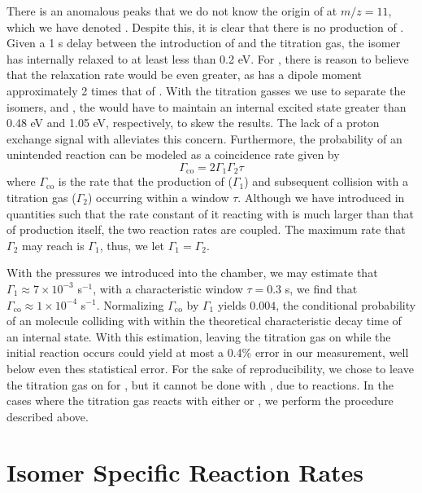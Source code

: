There is an anomalous peaks that we do not know the origin of at $m/z=11$, which we have denoted . Despite this, it is clear that there is no production of . Given a 1 s delay between the introduction of  and the titration gas, the  isomer has internally relaxed to at least less than 0.2 eV. For , there is reason to believe that the relaxation rate would be even greater, as  has a dipole moment approximately 2 times that of .\cite{Rogers1982} With the titration gasses we use to separate the isomers,  and , the  would have to maintain an internal excited state greater than 0.48 eV and 1.05 eV, respectively, to skew the results. The lack of a proton exchange signal with  alleviates this concern. Furthermore, the probability of an unintended reaction can be modeled as a coincidence rate given by 
\begin{equation*}
	\Gamma_{\mathrm{co}} = 2 \Gamma_1 \Gamma_2 \tau
\end{equation*}
where $\Gamma_{\mathrm{co}}$ is the rate that the production of  ($\Gamma_1$) and subsequent collision with a titration gas ($\Gamma_2$) occurring within a window $\tau$. Although we have introduced  in quantities such that the rate constant of it reacting with  is much larger than that of  production itself, the two reaction rates are coupled. The maximum rate that $\Gamma_2$ may reach is $\Gamma_1$, thus, we let $\Gamma_1 = \Gamma_2$.

With the pressures we introduced into the chamber, we may estimate that $\Gamma_1 \approx 7 \times 10^{-3}$ s$^{-1}$, with a characteristic window $\tau=0.3$ s, we find that $\Gamma_{\mathrm{co}} \approx 1 \times 10^{-4}$ s$^{-1}$. Normalizing $\Gamma_{\mathrm{co}}$ by $\Gamma_1$ yields $0.004$, the conditional probability of an  molecule colliding with  within the theoretical characteristic decay time of an internal state. With this estimation, leaving the titration gas on while the initial reaction occurs could yield at most a 0.4\% error in our measurement, well below even thes statistical error. For the sake of reproducibility, we chose to leave the titration gas on for , but it cannot be done with , due to  reactions. In the cases where the titration gas reacts with either  or , we perform the procedure described above.

\section{Isomer Specific Reaction Rates}

